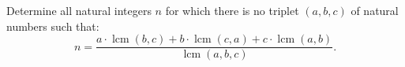 Determine all natural integers $n$ for which there is no triplet $(a,b,c)$ of natural numbers such that:
$$n=\frac{a\cdot\operatorname{lcm}(b,c)+b\cdot\operatorname{lcm}(c,a)
+c\cdot\operatorname{lcm}(a,b)}{\operatorname{lcm}(a,b,c)}.$$
